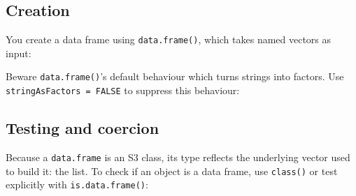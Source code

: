 \subsection{Creation}

You create a data frame using \texttt{data.frame()}, which takes named
vectors as input:

\begin{Shaded}
\begin{Highlighting}[]
\StringTok{ }\NormalTok{(} \NormalTok{:}\NormalTok{, } \NormalTok{(}\NormalTok{, }\NormalTok{, }\NormalTok{))}
\end{Highlighting}
\end{Shaded}

Beware \texttt{data.frame()}'s default behaviour which turns strings
into factors. Use \texttt{stringAsFactors = FALSE} to suppress this
behaviour: 

\begin{Shaded}
\begin{Highlighting}[]
\StringTok{ }\NormalTok{(}
   \NormalTok{:}\NormalTok{,}
   \NormalTok{(}\NormalTok{, }\NormalTok{, }\NormalTok{),}
   \NormalTok{)}
\end{Highlighting}
\end{Shaded}

\subsection{Testing and coercion}

Because a \texttt{data.frame} is an S3 class, its type reflects the
underlying vector used to build it: the list. To check if an object is a
data frame, use \texttt{class()} or test explicitly with
\texttt{is.data.frame()}:

\begin{Shaded}
\begin{Highlighting}[]
\end{Highlighting}
\end{Shaded}

